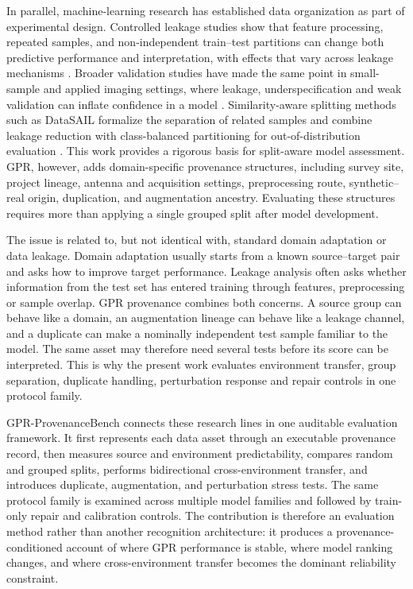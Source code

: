 \documentclass[]{interact}
\begin{document}
In parallel, machine-learning research has established data organization as part of experimental design. Controlled leakage studies show that feature processing, repeated samples, and non-independent train--test partitions can change both predictive performance and interpretation, with effects that vary across leakage mechanisms \cite{rosenblatt2024leakage,kapoor2023leakage}. Broader validation studies have made the same point in small-sample and applied imaging settings, where leakage, underspecification and weak validation can inflate confidence in a model \cite{vabalas2019validation,roberts2021pitfalls,damour2022underspecification}. Similarity-aware splitting methods such as DataSAIL formalize the separation of related samples and combine leakage reduction with class-balanced partitioning for out-of-distribution evaluation \cite{joeres2025datasail}. This work provides a rigorous basis for split-aware model assessment. GPR, however, adds domain-specific provenance structures, including survey site, project lineage, antenna and acquisition settings, preprocessing route, synthetic--real origin, duplication, and augmentation ancestry. Evaluating these structures requires more than applying a single grouped split after model development.

The issue is related to, but not identical with, standard domain adaptation or data leakage. Domain adaptation usually starts from a known source--target pair and asks how to improve target performance. Leakage analysis often asks whether information from the test set has entered training through features, preprocessing or sample overlap. GPR provenance combines both concerns. A source group can behave like a domain, an augmentation lineage can behave like a leakage channel, and a duplicate can make a nominally independent test sample familiar to the model. The same asset may therefore need several tests before its score can be interpreted. This is why the present work evaluates environment transfer, group separation, duplicate handling, perturbation response and repair controls in one protocol family.

GPR-ProvenanceBench connects these research lines in one auditable evaluation framework. It first represents each data asset through an executable provenance record, then measures source and environment predictability, compares random and grouped splits, performs bidirectional cross-environment transfer, and introduces duplicate, augmentation, and perturbation stress tests. The same protocol family is examined across multiple model families and followed by train-only repair and calibration controls. The contribution is therefore an evaluation method rather than another recognition architecture: it produces a provenance-conditioned account of where GPR performance is stable, where model ranking changes, and where cross-environment transfer becomes the dominant reliability constraint.
\end{document}
